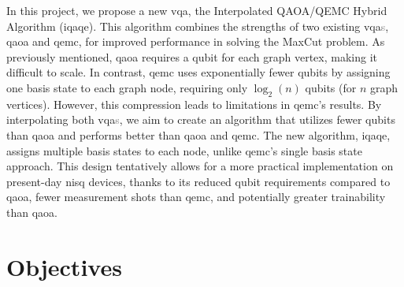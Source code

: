 

In this project, we propose a new \acrshort{vqa}, the Interpolated QAOA/QEMC Hybrid Algorithm (\acrshort{iqaqe}). This algorithm combines the strengths of two existing \acrshort{vqa}\textcolor{gray}{s}, \acrshort{qaoa} and \acrshort{qemc}, for improved performance in solving the MaxCut problem. As previously mentioned, \acrshort{qaoa} requires a qubit for each graph vertex, making it difficult to scale. In contrast, \acrshort{qemc} uses exponentially fewer qubits by assigning one basis state to each graph node, requiring only $\log_2(n)$ qubits (for $n$ graph vertices). However, this compression leads to limitations in \acrshort{qemc}'s results. By interpolating both \acrshort{vqa}\textcolor{gray}{s}, we aim to create an algorithm that utilizes fewer qubits than \acrshort{qaoa} and performs better than \acrshort{qaoa} and \acrshort{qemc}. The new algorithm, \acrshort{iqaqe}, assigns multiple basis states to each node, unlike \acrshort{qemc}'s single basis state approach. This design tentatively allows for a more practical implementation on present-day \acrshort{nisq} devices, thanks to its reduced qubit requirements compared to \acrshort{qaoa}, fewer measurement shots than \acrshort{qemc}, and potentially greater trainability than \acrshort{qaoa}.

\section{Objectives} %
\label{section:objectives}




